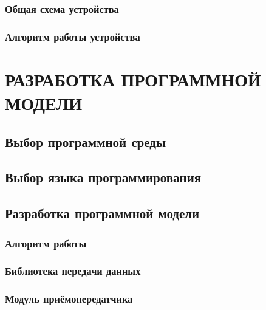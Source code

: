         \subsubsection{Общая схема устройства}
        

        \subsubsection{Алгоритм работы устройства}
        

\section{РАЗРАБОТКА ПРОГРАММНОЙ МОДЕЛИ}
\label{sec:coding}


    \subsection{Выбор программной среды}
    

    \subsection{Выбор языка программирования}
    

    \subsection{Разработка программной модели}
    
        \subsubsection{Алгоритм работы}
        

        \subsubsection{Библиотека передачи данных}
        

        \subsubsection{Модуль приёмопередатчика}
        


